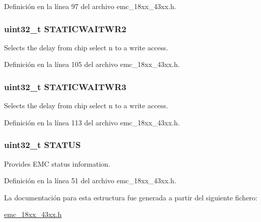 Definición en la línea 97 del archivo emc\+\_\+18xx\+\_\+43xx.\+h.

\subsubsection[{\texorpdfstring{S\+T\+A\+T\+I\+C\+W\+A\+I\+T\+W\+R2}{STATICWAITWR2}}]{ uint32\+\_\+t S\+T\+A\+T\+I\+C\+W\+A\+I\+T\+W\+R2}\hypertarget{struct_l_p_c___e_m_c___t_a5853889fbbea58f3f1f9688f6fcbcfe1}{}\label{struct_l_p_c___e_m_c___t_a5853889fbbea58f3f1f9688f6fcbcfe1}
Selects the delay from chip select n to a write access. 

Definición en la línea 105 del archivo emc\+\_\+18xx\+\_\+43xx.\+h.

\subsubsection[{\texorpdfstring{S\+T\+A\+T\+I\+C\+W\+A\+I\+T\+W\+R3}{STATICWAITWR3}}]{ uint32\+\_\+t S\+T\+A\+T\+I\+C\+W\+A\+I\+T\+W\+R3}\hypertarget{struct_l_p_c___e_m_c___t_a1b10905feb5017bb1f9c40950d79dc58}{}\label{struct_l_p_c___e_m_c___t_a1b10905feb5017bb1f9c40950d79dc58}
Selects the delay from chip select n to a write access. 

Definición en la línea 113 del archivo emc\+\_\+18xx\+\_\+43xx.\+h.

\subsubsection[{\texorpdfstring{S\+T\+A\+T\+US}{STATUS}}]{ uint32\+\_\+t S\+T\+A\+T\+US}\hypertarget{struct_l_p_c___e_m_c___t_aece2c880dc5ba01a2fc9326dc080dc26}{}\label{struct_l_p_c___e_m_c___t_aece2c880dc5ba01a2fc9326dc080dc26}
Provides E\+MC status information. 

Definición en la línea 51 del archivo emc\+\_\+18xx\+\_\+43xx.\+h.



La documentación para esta estructura fue generada a partir del siguiente fichero\+:\begin{DoxyCompactItemize}
\item 
\hyperlink{emc__18xx__43xx_8h}{emc\+\_\+18xx\+\_\+43xx.\+h}\end{DoxyCompactItemize}
